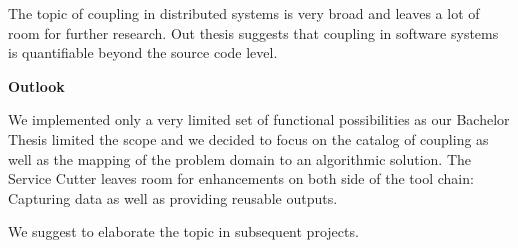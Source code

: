 The topic of coupling in distributed systems is very broad and leaves a lot of room for further research. Out thesis suggests that coupling in software systems is quantifiable beyond the source code level.

\textbf{Outlook}

We implemented only a very limited set of functional possibilities as our Bachelor Thesis limited the scope and we decided to focus on the catalog of coupling as well as the mapping of the problem domain to an algorithmic solution. The Service Cutter leaves room for enhancements on both side of the tool chain: Capturing data as well as providing reusable outputs.

We suggest to elaborate the topic in subsequent projects.